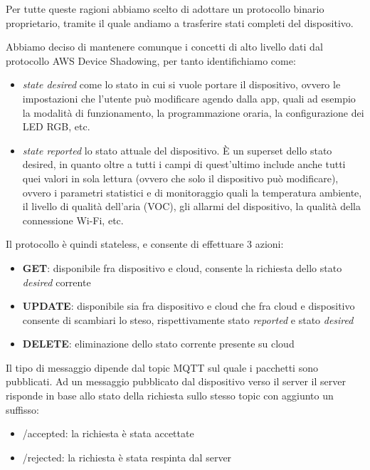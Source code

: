 \documentclass[a4paper,titlepage]{article}
\begin{document}
Per tutte queste ragioni abbiamo scelto di adottare un protocollo binario proprietario,
tramite il quale andiamo a trasferire stati completi del dispositivo.

Abbiamo deciso di mantenere comunque i concetti di alto livello dati dal protocollo AWS
Device Shadowing, per tanto identifichiamo come:
\begin{itemize}
    \item \textit{state desired} come lo stato in cui si vuole portare il dispositivo, ovvero le
        impostazioni che l'utente può modificare agendo dalla app, quali ad esempio la modalità di funzionamento,
        la programmazione oraria, la configurazione dei LED RGB, etc.
    \item \textit{state reported} lo stato attuale del dispositivo. È un superset dello stato
        desired, in quanto oltre a tutti i campi di quest'ultimo include anche tutti quei valori
        in sola lettura (ovvero che solo il dispositivo può modificare), ovvero i parametri
        statistici e di monitoraggio quali la temperatura ambiente, il livello di qualità dell'aria (VOC),
        gli allarmi del dispositivo, la qualità della connessione Wi-Fi, etc.
\end{itemize}

Il protocollo è quindi stateless, e consente di effettuare 3 azioni:

\begin{itemize}
    \item \textbf{GET}: disponibile fra dispositivo e cloud, consente la richiesta dello stato \textit{desired} corrente
    \item \textbf{UPDATE}: disponibile sia fra dispositivo e cloud che fra cloud e dispositivo consente di scambiari lo steso,
        rispettivamente stato \textit{reported} e stato \textit{desired}
    \item \textbf{DELETE}: eliminazione dello stato corrente presente su cloud
\end{itemize}

Il tipo di messaggio dipende dal topic MQTT sul quale i pacchetti sono pubblicati. Ad
un messaggio pubblicato dal dispositivo verso il server il server risponde in base allo
stato della richiesta sullo stesso topic con aggiunto un suffisso:
\begin{itemize}
    \item /accepted: la richiesta è stata accettate
    \item /rejected: la richiesta è stata respinta dal server
\end{itemize}
\end{document}
